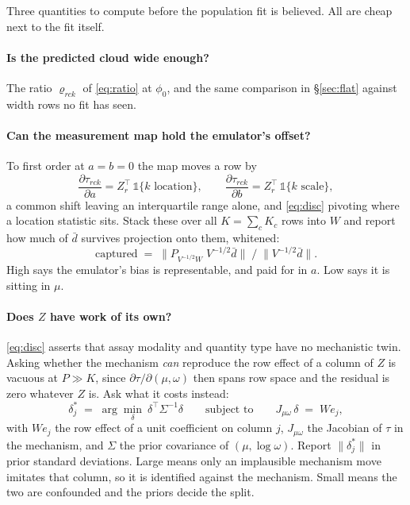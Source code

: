 \documentclass[11pt]{article}
\newcommand{\Tr}{^{\!\top}}
\begin{document}
Three quantities to compute before the population fit is believed. All are cheap
next to the fit itself.

\paragraph{Is the predicted cloud wide enough?} The ratio $\varrho_{rck}$ of
\eqref{eq:ratio} at $\phi_0$, and the same comparison in \S\ref{sec:flat} against
width rows no fit has seen.

\paragraph{Can the measurement map hold the emulator's offset?} To first order at
$a=b=0$ the map moves a row by
\begin{equation}
\frac{\partial\tau_{rck}}{\partial a} = Z_r\Tr\,\mathbb{1}\{k \text{ location}\},
\qquad
\frac{\partial\tau_{rck}}{\partial b} = Z_r\Tr\,\mathbb{1}\{k \text{ scale}\},
\label{eq:absorb}
\end{equation}
a common shift leaving an interquartile range alone, and \eqref{eq:disc} pivoting
where a location statistic sits. Stack these over all $K=\sum_c K_c$ rows into
$W$ and report how much of $\bar d$ survives projection onto them, whitened:
\begin{equation}
\text{captured} \;=\;
\big\|P_{V^{-1/2}W}\;V^{-1/2}\bar d\big\|
\;\Big/\;
\big\|V^{-1/2}\bar d\big\| .
\label{eq:absorbfrac}
\end{equation}
High says the emulator's bias is representable, and paid for in $a$. Low says it
is sitting in $\mu$.

\paragraph{Does $Z$ have work of its own?} \eqref{eq:disc} asserts that assay
modality and quantity type have no mechanistic twin. Asking whether the mechanism
\emph{can} reproduce the row effect of a column of $Z$ is vacuous at $P\gg K$,
since $\partial\tau/\partial(\mu,\omega)$ then spans row space and the residual is
zero whatever $Z$ is. Ask what it costs instead:
\begin{equation}
\delta^{\ast}_j \;=\; \arg\min_{\delta}\ \delta\Tr\Sigma^{-1}\delta
\qquad\text{subject to}\qquad
J_{\mu\omega}\,\delta \;=\; W e_j ,
\label{eq:zcost}
\end{equation}
with $W e_j$ the row effect of a unit coefficient on column $j$, $J_{\mu\omega}$
the Jacobian of $\tau$ in the mechanism, and $\Sigma$ the prior covariance of
$(\mu,\log\omega)$. Report $\|\delta^{\ast}_j\|$ in prior standard deviations.
Large means only an implausible mechanism move imitates that column, so it is
identified against the mechanism. Small means the two are confounded and the
priors decide the split.
\end{document}
